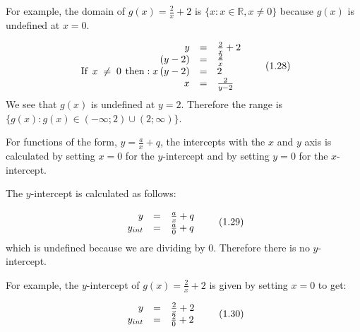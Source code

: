 \label{m39341*id247371}For example, the domain of $g\left(x\right)=\frac{2}{x}+2$ is $\{x:x\in \mathbb{R},x\ne 0\}$ because $g\left(x\right)$ is undefined at $x=0$.\par 
\label{m39341*id247472}\nopagebreak\noindent{}
\begin{equation}
\begin{array}{ccc}\hfill y& =& \frac{2}{x}+2\hfill \\ \hfill \left(y-2\right)& =& \frac{2}{x}\hfill \\ \hfill \mathrm{If}\phantom{\rule{4pt}{0ex}}x\; \ne \;  0 \phantom{\rule{4pt}{0ex}}\mathrm{then}:x\left(y-2\right)& =& 2\hfill \\ \hfill x& =& \frac{2}{y-2}\hfill \end{array}\tag{1.28}
\end{equation}
\label{m39341*id247614}We see that $g\left(x\right)$ is undefined at $y=2$. Therefore the range is $\{g\left(x\right):g\left(x\right)\in \left(-\infty ;2\right)\cup \left(2;\infty \right)\}$.\par 
\label{m39341*uid153}
\nopagebreak
\label{m39341*id247720}For functions of the form, $y=\frac{a}{x}+q$, the intercepts with the $x$ and $y$ axis is calculated by setting $x=0$ for the $y$-intercept and by setting $y=0$ for the $x$-intercept.\par 
\label{m39341*id247814}The $y$-intercept is calculated as follows:\par 
\label{m39341*uid154}\nopagebreak\noindent{}
\begin{equation}
\begin{array}{ccc}\hfill y& =& \frac{a}{x}+q\hfill \\ \hfill {y}_{int}& =& \frac{a}{0}+q\hfill \end{array}\tag{1.29}
\end{equation}
\label{m39341*id247904}which is undefined because we are dividing by 0. Therefore there is no $y$-intercept.\par 
\label{m39341*id247920}For example, the $y$-intercept of $g\left(x\right)=\frac{2}{x}+2$ is given by setting $x=0$ to get:\par 
\label{m39341*id247979}\nopagebreak\noindent{}
\begin{equation}
\begin{array}{ccc}\hfill y& =& \frac{2}{x}+2\hfill \\ \hfill {y}_{int}& =& \frac{2}{0}+2\hfill \end{array}\tag{1.30}
\end{equation}
